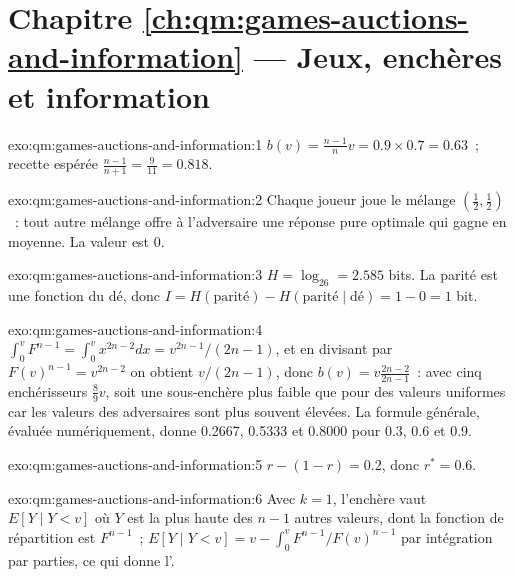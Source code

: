 \section*{Chapitre \ref{ch:qm:games-auctions-and-information} --- Jeux, enchères et information}

\begin{solution}{exo:qm:games-auctions-and-information:1}
$b(v) = \frac{n-1}nv = 0.9 \times 0.7 = 0.63$~; recette espérée $\frac{n-1}{n+1} = \frac9{11} = 0.818$.
\end{solution}

\begin{solution}{exo:qm:games-auctions-and-information:2}
Chaque joueur joue le mélange $(\frac12, \frac12)$~: tout autre mélange offre à l'adversaire une réponse pure optimale qui gagne en moyenne. La valeur est 0.
\end{solution}

\begin{solution}{exo:qm:games-auctions-and-information:3}
$H = \log_26 = 2.585$ bits. La parité est une fonction du dé, donc $I = H(\text{parité}) - H(\text{parité} \mid \text{dé}) = 1 - 0 = 1$ bit.
\end{solution}

\begin{solution}{exo:qm:games-auctions-and-information:4}
$\int_0^vF^{n-1} = \int_0^vx^{2n-2}dx = v^{2n-1}/(2n-1)$, et en divisant par $F(v)^{n-1} = v^{2n-2}$ on obtient $v/(2n-1)$, donc $b(v) = v\frac{2n-2}{2n-1}$~: avec cinq enchérisseurs $\frac89v$, soit une sous-enchère plus faible que pour des valeurs uniformes
car les valeurs des adversaires sont plus souvent élevées. La formule générale, évaluée numériquement, donne 0.2667, 0.5333 et 0.8000 pour 0.3, 0.6 et 0.9.
\end{solution}

\begin{solution}{exo:qm:games-auctions-and-information:5}
$r - (1 - r) = 0.2$, donc $r^* = 0.6$.
\end{solution}

\begin{solution}{exo:qm:games-auctions-and-information:6}
Avec $k = 1$, l'enchère vaut $E[Y \mid Y < v]$ où $Y$ est la plus haute des $n - 1$ autres valeurs, dont la fonction de répartition est $F^{n-1}$~; $E[Y \mid Y < v] = v - \int_0^vF^{n-1}/F(v)^{n-1}$ par intégration par parties, ce qui donne
l'.
\end{solution}


